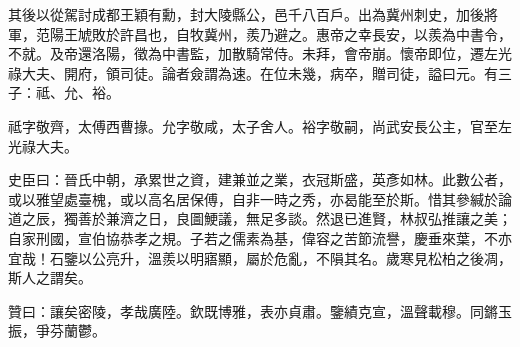 \begin{pinyinscope}
 其後以從駕討成都王穎有勳，封大陵縣公，邑千八百戶。出為冀州刺史，加後將軍，范陽王虓敗於許昌也，自牧冀州，羨乃避之。惠帝之幸長安，以羨為中書令，不就。及帝還洛陽，徵為中書監，加散騎常侍。未拜，會帝崩。懷帝即位，遷左光祿大夫、開府，領司徒。論者僉謂為速。在位未幾，病卒，贈司徒，謚曰元。有三子：祗、允、裕。



 祗字敬齊，太傅西曹掾。允字敬咸，太子舍人。裕字敬嗣，尚武安長公主，官至左光祿大夫。



 史臣曰：晉氏中朝，承累世之資，建兼並之業，衣冠斯盛，英彥如林。此數公者，或以雅望處臺槐，或以高名居保傅，自非一時之秀，亦曷能至於斯。惜其參緘於論道之辰，獨善於兼濟之日，良圖鯁議，無足多談。然退已進賢，林叔弘推讓之美；自家刑國，宣伯協恭孝之規。子若之儒素為基，偉容之苦節流譽，慶垂來葉，不亦宜哉！石鑒以公亮升，溫羨以明寤顯，屬於危亂，不隕其名。歲寒見松柏之後凋，斯人之謂矣。



 贊曰：讓矣密陵，孝哉廣陸。欽既博雅，表亦貞肅。鑒績克宣，溫聲載穆。同鏘玉振，爭芬蘭鬱。



\end{pinyinscope}